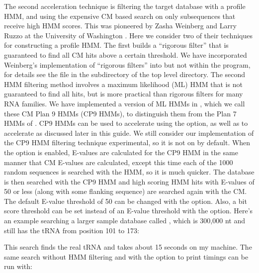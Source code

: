 The second acceleration technique is filtering the target database
with a profile HMM, and using the expensive CM based search on only
subsequences that receive high HMM scores. This was pioneered by Zasha
Weinberg and Larry Ruzzo at the University of Washington
\cite{WeinbergRuzzo04,WeinbergRuzzo04b,WeinbergRuzzo06}. Here we
consider two of their techniques for constructing a profile HMM. The
first builds a ``rigorous filter'' that is guaranteed to find all CM
hits above a certain threshold. We have incorporated Weinberg's
implementation of ``rigorous filters'' into  but
not within the  program, for details see the file
 in the 
subdirectory of the top level  directory. The second
HMM filtering method involves a maximum likelihood (ML) HMM that is
not guaranteed to find all hits, but is more practical than rigorous
filters for many RNA families. We have implemented a version of ML
HMMs in , which we call these CM Plan 9 HMMs (CP9
HMMs), to distinguish them from the Plan 7 HMMs of .
CP9 HMMs can be used to accelerate  using the
 option, as well as to accelerate  as
discussed later in this guide.  We still consider our implementation
of the CP9 HMM filtering technique experimental, so it is not on by
default.  When the  option is enabled, E-values are
calculated for the CP9 HMM in the same manner that CM E-values are
calculated, except this time each of the 1000 random sequences is
searched with the HMM, so it is much quicker. The database is then
searched with the CP9 HMM and high scoring HMM hits with E-values of
50 or less (along with some flanking sequence) are searched again with
the CM.  The default E-value threshold of 50 can be changed with the
 option. Also, a bit score threshold can be set instead
of an E-value threshold with the  option.  Here's an
example searching a larger sample database called
, which is 300,000 nt and still has the tRNA
from position 101 to 173:


This search finds the real tRNA and takes about 15 seconds on my
machine. The same search without HMM filtering and with the 
option to print timings can be run with:


